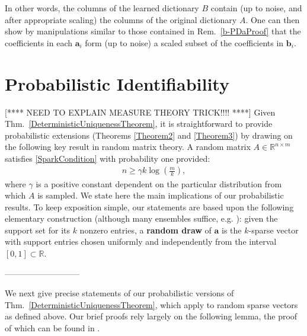 \documentclass[journal, twocolumn]{IEEEtran}
\newtheorem{definition}{Definition}
\begin{document}
In other words, the columns of the learned dictionary $B$ contain (up to noise, and after appropriate scaling) the columns of the original dictionary $A$. One can then show by manipulations similar to those contained in Rem.~\ref{b-PDaProof} that the coefficients in each $\mathbf{a}_i$ form (up to noise) a scaled subset of the coefficients in $\mathbf{b}_i$.



\section{Probabilistic Identifiability}\label{PUT}

[**** NEED TO EXPLAIN MEASURE THEORY TRICK!!!! ****]
Given Thm.~\ref{DeterministicUniquenessTheorem}, it is straightforward to provide probabilistic extensions (Theorems \ref{Theorem2} and \ref{Theorem3}) by drawing on the following key result in random matrix theory. A random matrix $A \in \mathbb{R}^{n \times m}$ satisfies \eqref{SparkCondition} with probability one 
provided:
\begin{align}\label{CScondition}
n \geq \gamma k\log\left(\frac{m}{k}\right),
\end{align}
where $\gamma$ is a positive constant dependent on the particular distribution from which $A$ is sampled. \cite{??} We state here the main implications of our probabilistic results. To keep exposition simple, our statements are based upon the following elementary construction (although many ensembles suffice, e.g. \cite[Sec.~4]{Baraniuk08}): 
given the support set for its $k$ nonzero entries, a \textbf{random draw} of $\mathbf{a}$ is the $k$-sparse vector with support entries chosen uniformly and independently from the interval $[0, 1] \subset \mathbb{R}$.


---------------------------

We next give precise statements of our probabilistic versions of Thm.~\ref{DeterministicUniquenessTheorem}, which apply to random sparse vectors as defined above. Our brief proofs rely largely on the following lemma, the proof of which can be found in \cite[Lem.~3]{Hillar15}.
\end{document}
